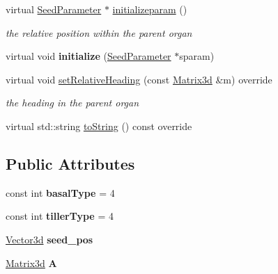 \begin{DoxyCompactItemize}
\mbox{\label{classCPlantBox_1_1Seed_a448f63c8fb85ee64dfd04b2008915a02}} 
virtual \hyperlink{classCPlantBox_1_1SeedParameter}{Seed\+Parameter} $\ast$ \hyperlink{classCPlantBox_1_1Seed_a448f63c8fb85ee64dfd04b2008915a02}{initializeparam} ()
\begin{DoxyCompactList}\small\item\em the relative position within the parent organ \end{DoxyCompactList}\item 
\mbox{\label{classCPlantBox_1_1Seed_a203f63a931d9e408cc8b5df1c41dfb98}} 
virtual void {\bfseries initialize} (\hyperlink{classCPlantBox_1_1SeedParameter}{Seed\+Parameter} $\ast$sparam)
\item 
\mbox{\label{classCPlantBox_1_1Seed_abffd84c1b6904f93b69368f811baeb37}} 
virtual void \hyperlink{classCPlantBox_1_1Seed_abffd84c1b6904f93b69368f811baeb37}{set\+Relative\+Heading} (const \hyperlink{classCPlantBox_1_1Matrix3d}{Matrix3d} \&m) override
\begin{DoxyCompactList}\small\item\em the heading in the parent organ \end{DoxyCompactList}\item 
virtual std\+::string \hyperlink{classCPlantBox_1_1Seed_a83a1493777594b1e92d31d6d3db4258b}{to\+String} () const override
\end{DoxyCompactItemize}
\subsection*{Public Attributes}
\begin{DoxyCompactItemize}
\item 
\mbox{\label{classCPlantBox_1_1Seed_adf587d9e6b6a4f93c9c481a8ec1c8db8}} 
const int {\bfseries basal\+Type} = 4
\item 
\mbox{\label{classCPlantBox_1_1Seed_a69a614d5837c8809a259bf42a17ede1a}} 
const int {\bfseries tiller\+Type} = 4
\item 
\mbox{\label{classCPlantBox_1_1Seed_aae71d925df2703af8a5b1a7e568fb645}} 
\hyperlink{classCPlantBox_1_1Vector3d}{Vector3d} {\bfseries seed\+\_\+pos}
\item 
\mbox{\label{classCPlantBox_1_1Seed_a9eefe2e378afaf99d9e5637840a6c082}} 
\hyperlink{classCPlantBox_1_1Matrix3d}{Matrix3d} {\bfseries A}
\end{DoxyCompactItemize}
